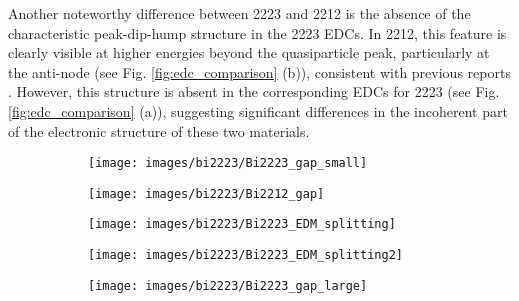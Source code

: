 Another noteworthy difference between 2223 and 2212 is the absence of the characteristic peak-dip-hump structure in the 2223 EDCs.
In 2212, this feature is clearly visible at higher energies beyond the quasiparticle peak, particularly at the anti-node (see Fig. \ref{fig:edc_comparison} (b)), consistent with previous reports \cite{kordyuk_origin_2002}.
However, this structure is absent in the corresponding EDCs for 2223 (see Fig. \ref{fig:edc_comparison} (a)), suggesting significant differences in the incoherent part of the electronic structure of these two materials.

\begin{figure}
	\centering
	\begin{subfigure}[b]{0.4\textwidth}
		\texttt{[image: images/bi2223/Bi2223\_gap\_small]}
		\caption{}
	\end{subfigure}
	\begin{subfigure}[b]{0.2\textwidth}
		\texttt{[image: images/bi2223/Bi2212\_gap]}
		\caption{}
	\end{subfigure}
	\caption{(a) Evolution of EDCs across the primary Fermi arc, with the positions of the EDCs corresponding to the markers in Fig. \ref{fig:bi2223_fs} (a). The left panel shows the EDCs at \qty{12}{\kelvin}. From the anti-node at (\qty{-0.55}{\per\angstrom}, \qty{0.18}{\per\angstrom}) across the arc to the opposite anti-node near (\qty{-0.2}{\per\angstrom}, \qty{0.48}{\per\angstrom}), a superconducting gap is observed, which continuously closes towards the node and reopens afterward. The right panel shows the same EDCs at room temperature (RT), where the gap has disappeared. (b) The same EDCs along the Fermi arc of 2212, where, in general, a larger gap is observed compared to the primary arc of 2223.}
	\label{fig:gap_bilayer}
	\centering
	\begin{subfigure}[b]{0.27\textwidth}
		\texttt{[image: images/bi2223/Bi2223\_EDM\_splitting]}
		\caption{}
	\end{subfigure}
	\begin{subfigure}[b]{0.3\textwidth}
		\texttt{[image: images/bi2223/Bi2223\_EDM\_splitting2]}
		\caption{}
	\end{subfigure}
	\begin{subfigure}[b]{0.39\textwidth}
		\texttt{[image: images/bi2223/Bi2223\_gap\_large]}
		\caption{}
	\end{subfigure}

\end{figure}
